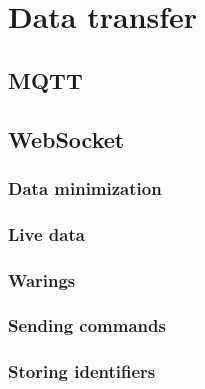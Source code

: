 
\section{Data transfer}
\label{sec:data_transfer}



\subsection{MQTT}
\label{subsec:mqtt}



\subsection{WebSocket}
\label{subsec:websocket}


\subsubsection{Data minimization}
\label{subsec:data_minimization}


\subsubsection{Live data}
\label{subsec:live_data}


\subsubsection{Warings}
\label{subsec:warnings}


\subsubsection{Sending commands}
\label{subsec:sending_commands}


\subsubsection{Storing identifiers}
\label{subsec:storing_identifiers}
